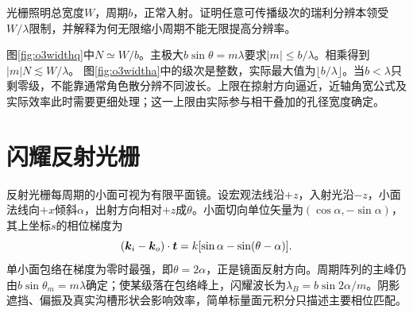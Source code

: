 \begin{example}\label{ex:o3width}
光栅照明总宽度$W$，周期$b$，正常入射。证明任意可传播级次的瑞利分辨本领受$W/\lambda$限制，并解释为何无限缩小周期不能无限提高分辨率。
\end{example}
\begin{solution}
图\ref{fig:o3widthq}中$N\simeq W/b$。主极大$b\sin\theta=m\lambda$要求$|m|\leq b/\lambda$。相乘得到$|m|N\lesssim W/\lambda$。
图\ref{fig:o3widtha}中的级次是整数，实际最大值为$\lfloor b/\lambda\rfloor$。当$b<\lambda$只剩零级，不能靠通常角色散分辨不同波长。上限在掠射方向逼近，近轴角宽公式及实际效率此时需要更细处理；这一上限由实际参与相干叠加的孔径宽度确定。
\end{solution}

\section{闪耀反射光栅}\label{th:o3blaze}
反射光栅每周期的小面可视为有限平面镜。设宏观法线沿$+z$，入射光沿$-z$，小面法线向$+x$倾斜$\alpha$，出射方向相对$+z$成$\theta$。小面切向单位矢量为$(\cos\alpha,-\sin\alpha)$，其上坐标$s$的相位梯度为
\[
 (\bm{k}_i-\bm{k}_o)\cdot\bm{t}
 =k[\sin\alpha-\sin(\theta-\alpha)].
\]
单小面包络在梯度为零时最强，即$\theta=2\alpha$，正是镜面反射方向。周期阵列的主峰仍由$b\sin\theta_m=m\lambda$确定；使某级落在包络峰上，闪耀波长为$\lambda_B=b\sin2\alpha/m$。阴影遮挡、偏振及真实沟槽形状会影响效率，简单标量面元积分只描述主要相位匹配。

